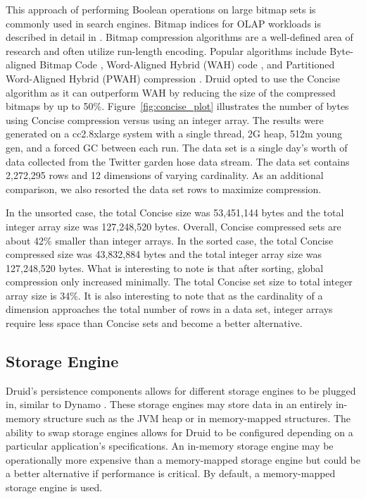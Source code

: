 \documentclass{acm_proc_article-sp}
\begin{document}
This approach of performing Boolean operations on large bitmap sets is commonly
used in search engines. Bitmap indices for OLAP workloads is described in
detail in \cite{o1997improved}. Bitmap compression algorithms are a
well-defined area of research and often utilize run-length encoding. Popular
algorithms include Byte-aligned Bitmap Code \cite{antoshenkov1995byte},
Word-Aligned Hybrid (WAH) code \cite{wu2006optimizing}, and Partitioned
Word-Aligned Hybrid (PWAH) compression \cite{van2011memory}. Druid opted to use
the Concise algorithm \cite{colantonio2010concise} as it can outperform WAH by
reducing the size of the compressed bitmaps by up to 50\%.
Figure~\ref{fig:concise_plot} illustrates the number of bytes using Concise
compression versus using an integer array. The results were generated on a
cc2.8xlarge system with a single thread, 2G heap, 512m young gen, and a forced
GC between each run. The data set is a single day’s worth of data collected
from the Twitter garden hose \cite{twitter2013} data stream. The data set
contains 2,272,295 rows and 12 dimensions of varying cardinality. As an
additional comparison, we also resorted the data set rows to maximize
compression.

In the unsorted case, the total Concise size was 53,451,144 bytes and the total
integer array size was 127,248,520 bytes. Overall, Concise compressed sets are
about 42\% smaller than integer arrays.  In the sorted case, the total Concise
compressed size was 43,832,884 bytes and the total integer array size was
127,248,520 bytes.  What is interesting to note is that after sorting, global
compression only increased minimally. The total Concise set size to total
integer array size is 34\%. It is also interesting to note that as the
cardinality of a dimension approaches the total number of rows in a data set,
integer arrays require less space than Concise sets and become a better
alternative.

\subsection{Storage Engine}
Druid’s persistence components allows for different storage engines to be
plugged in, similar to Dynamo \cite{decandia2007dynamo}. These storage engines
may store data in an entirely in-memory structure such as the JVM heap or in
memory-mapped structures. The ability to swap storage engines allows for Druid
to be configured depending on a particular application’s specifications. An
in-memory storage engine may be operationally more expensive than a
memory-mapped storage engine but could be a better alternative if performance
is critical. By default, a memory-mapped storage engine is used.
\end{document}
